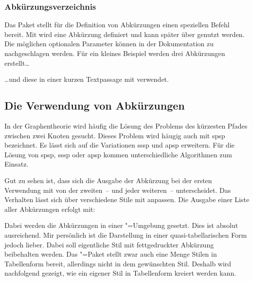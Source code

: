 \documentclass[%
  english,ngerman,%
  geometry=no,DIV=12,automark,%
]{tudscrartcl}
\begin{document}
\subsubsection{Abkürzungsverzeichnis}
Das Paket  stellt für die Definition von Abkürzungen einen 
speziellen Befehl bereit. Mit\LParameter{}%
 wird eine Abkürzung definiert und 
kann später über  genutzt werden. Die möglichen optionalen 
Parameter können in der Dokumentation zu  nachgeschlagen 
werden. Für ein kleines Beispiel werden drei Abkürzungen erstellt\dots
%
\begin{Trunk*}

\end{Trunk*}
%
\dots und diese in einer kurzen Textpassage mit  
verwendet.
%
\begin{Trunk+}
\section{Die Verwendung von Abkürzungen}
\end{Trunk+}
\begin{Trunk*}
In der Graphentheorie wird häufig die Lösung des Problems des kürzesten
Pfades zwischen zwei Knoten gesucht. Dieses Problem wird häugig auch
mit \gls{spsp} bezeichnet. Es lässt sich auf die Variationen \gls{sssp}
und \gls{apsp} erweitern. Für die Lösung von \gls{spsp}, \gls{sssp} 
oder \gls{apsp} kommen unterschiedliche Algorithmen zum Einsatz.

\end{Trunk*}
%
Gut zu sehen ist, dass sich die Ausgabe der Abkürzung bei der ersten Verwendung 
mit  von der zweiten~-- und jeder weiteren~-- unterscheidet. Das 
Verhalten lässt sich über verschiedene Stile mit  
anpassen. Die Ausgabe einer Liste aller Abkürzungen erfolgt mit:
%
\begin{Hint}
\printacronyms
\end{Hint}
\begin{quoting}[rightmargin=0pt]
\vspace*{-\baselineskip}
\glsdisablehyper
\InputCode
\end{quoting}
%
Dabei werden die Abkürzungen in einer "=Umgebung 
gesetzt. Dies ist absolut ausreichend. Mir persönlich ist die Darstellung in 
einer quasi-tabellarischen Form jedoch lieber. Dabei soll eigentliche Stil mit 
fettgedruckter Abkürzung beibehalten werden. Das "=Paket 
stellt zwar auch eine Menge Stilen in Tabellenform bereit, allerdings nicht in 
dem gewünschten Stil. Deshalb wird nachfolgend gezeigt, wie ein eigener Stil in 
Tabellenform kreiert werden kann. 
\end{document}
